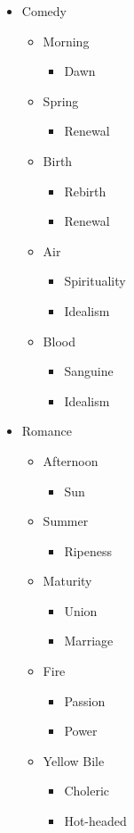 \documentclass[11pt]{article}
\begin{document}
\begin{itemize}
\item Comedy
\label{sec:orgacbb79f}
\begin{itemize}
\item Morning
\begin{itemize}
\item Dawn
\end{itemize}
\item Spring
\begin{itemize}
\item Renewal
\end{itemize}
\item Birth
\begin{itemize}
\item Rebirth
\item Renewal
\end{itemize}
\item Air
\begin{itemize}
\item Spirituality
\item Idealism
\end{itemize}
\item Blood
\begin{itemize}
\item Sanguine
\item Idealism
\end{itemize}
\end{itemize}

\item Romance
\label{sec:org142803c}
\begin{itemize}
\item Afternoon
\begin{itemize}
\item Sun
\end{itemize}
\item Summer
\begin{itemize}
\item Ripeness
\end{itemize}
\item Maturity
\begin{itemize}
\item Union
\item Marriage
\end{itemize}
\item Fire
\begin{itemize}
\item Passion
\item Power
\end{itemize}
\item Yellow Bile
\begin{itemize}
\item Choleric
\item Hot-headed
\end{itemize}
\end{itemize}


\end{itemize}
\end{document}
